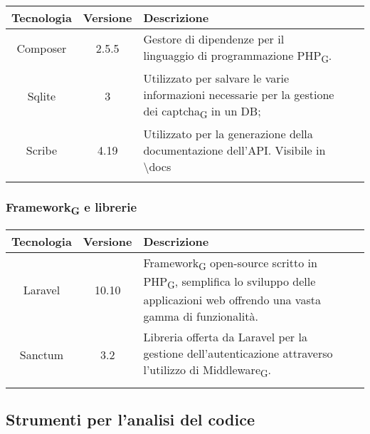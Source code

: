 \begin{center}
\setlength\extrarowheight{5pt}
\renewcommand\tabularxcolumn[1]{>{\Centering}m{#1}}
\begin{tabularx}{\textwidth}{| c | c | X | X | X |} 
	\hline
	\rowcolor{white}
	\textbf{Tecnologia} & \textbf{Versione} & \textbf{Descrizione}\\
	\hline
	Composer & 2.5.5 &  Gestore di dipendenze per il linguaggio di programmazione PHP\textsubscript{G}.\\
	\hline
	Sqlite & 3 & Utilizzato per salvare le varie informazioni necessarie per la gestione dei captcha\textsubscript{G} in un DB;\\
	\hline
	Scribe & 4.19 & Utilizzato per la generazione della documentazione dell'API. Visibile in \textbackslash docs\\
	\rowcolor{white}
	\caption{Strumenti utilizzati}
\end{tabularx}
\end{center}
\newpage
\subsubsection{Framework\textsubscript{G} e librerie}

\begin{center}
\setlength\extrarowheight{5pt}
\renewcommand\tabularxcolumn[1]{>{\Centering}m{#1}}
\begin{tabularx}{\textwidth}{| c | c | X | X | X |} 
	\hline
	\rowcolor{white}
	\textbf{Tecnologia} & \textbf{Versione} & \textbf{Descrizione}\\
	\hline
	Laravel & 10.10 & Framework\textsubscript{G} open-source scritto in PHP\textsubscript{G}, semplifica lo sviluppo delle applicazioni web offrendo una vasta gamma di funzionalità.\\
	\hline
	Sanctum & 3.2 & Libreria offerta da Laravel per la gestione dell'autenticazione attraverso l'utilizzo di Middleware\textsubscript{G}.\\
	\hline
	\rowcolor{white}
	\caption{Framework\textsubscript{G} e librerie utilizzati}
\end{tabularx}
\end{center}

\subsection{Strumenti per l’analisi del codice}

